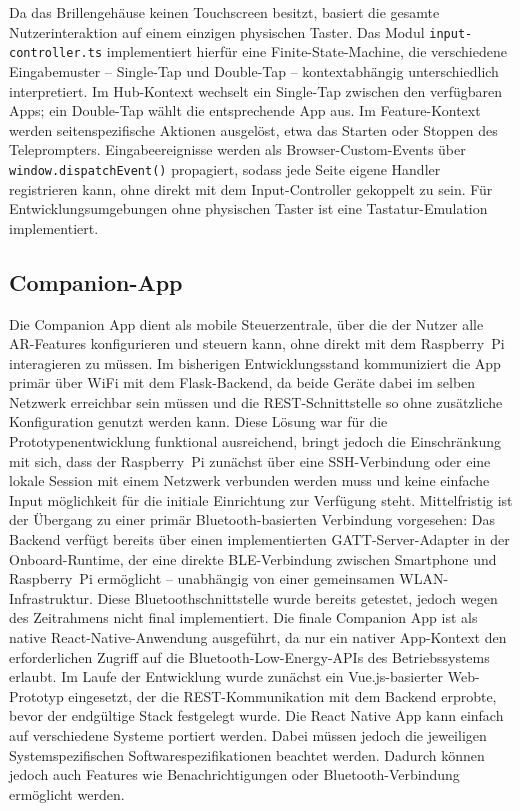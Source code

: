 Da das Brillengehäuse keinen Touchscreen besitzt, basiert die gesamte
Nutzerinteraktion auf einem einzigen physischen Taster.
Das Modul \texttt{input-controller.ts} implementiert hierfür eine
Finite-State-Machine, die verschiedene Eingabemuster -- Single-Tap und
Double-Tap -- kontextabhängig unterschiedlich interpretiert.
Im Hub-Kontext wechselt ein Single-Tap zwischen den verfügbaren Apps;
ein Double-Tap wählt die entsprechende App aus.
Im Feature-Kontext werden seitenspezifische Aktionen ausgelöst, etwa das
Starten oder Stoppen des Teleprompters.
Eingabeereignisse werden als Browser-Custom-Events über \texttt{window.dispatchEvent()}
propagiert, sodass jede Seite eigene Handler registrieren kann, ohne direkt
mit dem Input-Controller gekoppelt zu sein.
Für Entwicklungsumgebungen ohne physischen Taster ist eine
Tastatur-Emulation implementiert.

\subsection{Companion-App}
\label{subsec:companionImpl}

Die Companion App dient als mobile Steuerzentrale, über die der Nutzer alle
AR-Features konfigurieren und steuern kann, ohne direkt mit dem Raspberry~Pi
interagieren zu müssen.
Im bisherigen Entwicklungsstand kommuniziert die App primär über WiFi mit dem
Flask-Backend, da beide Geräte dabei im selben Netzwerk erreichbar sein müssen
und die REST-Schnittstelle so ohne zusätzliche Konfiguration genutzt werden kann.
Diese Lösung war für die Prototypenentwicklung funktional ausreichend, bringt
jedoch die Einschränkung mit sich, dass der Raspberry~Pi zunächst über eine
SSH-Verbindung oder eine lokale Session mit einem Netzwerk verbunden werden muss und keine einfache Input möglichkeit für die initiale Einrichtung zur Verfügung steht.
\newpage
Mittelfristig ist der Übergang zu einer primär Bluetooth-basierten Verbindung
vorgesehen: Das Backend verfügt bereits über einen implementierten
GATT-Server-Adapter in der Onboard-Runtime, der eine direkte BLE-Verbindung
zwischen Smartphone und Raspberry~Pi ermöglicht -- unabhängig von einer
gemeinsamen WLAN-Infrastruktur. Diese Bluetoothschnittstelle wurde bereits getestet, jedoch wegen des Zeitrahmens nicht final implementiert.
Die finale Companion App ist als native React-Native-Anwendung ausgeführt,
da nur ein nativer App-Kontext den erforderlichen Zugriff auf die
Bluetooth-Low-Energy-APIs des Betriebssystems erlaubt.
Im Laufe der Entwicklung wurde zunächst ein Vue.js-basierter Web-Prototyp
eingesetzt, der die REST-Kommunikation mit dem Backend erprobte, bevor der
endgültige Stack festgelegt wurde. Die React Native App kann einfach auf verschiedene Systeme portiert werden. Dabei müssen jedoch die jeweiligen Systemspezifischen Softwarespezifikationen beachtet werden. Dadurch können jedoch auch Features wie Benachrichtigungen oder Bluetooth-Verbindung ermöglicht werden.

